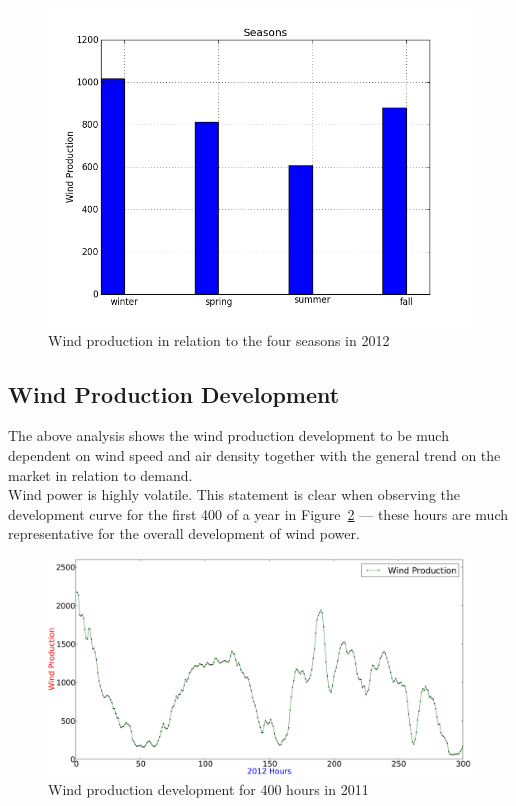 \begin{figure}[H]
\centering
\includegraphics[width=0.99\linewidth,natwidth=898,natheight=587]{billeder/Seasons/windProdctionSeasons.png}
\caption{Wind production in relation to the four seasons in 2012}
\label{fig:windProductionSeasons}
\end{figure}

\subsection{Wind Production Development}
\label{sec:windProductionDev}
The above analysis shows the wind production development to be much dependent on wind speed and air density together with the general trend on the market in relation to demand. 
\\[0.5cm]
Wind power is highly volatile. This statement is clear when observing the development curve for the first 400 of a year in Figure~\ref{fig:windHourDevelopment400Hours} --- these hours are much representative for the overall development of wind power. 

\begin{figure}[H]
\centering
\includegraphics[width=0.99\linewidth,natwidth=898,natheight=587]{billeder/productionTendency400Hours.png}
\caption{Wind production development for 400 hours in 2011}
\label{fig:windHourDevelopment400Hours}
\end{figure}

